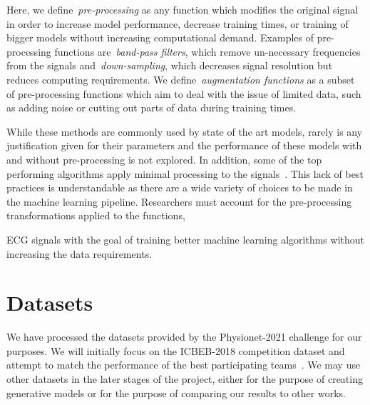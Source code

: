 \documentclass{article}
\begin{document}
Here, we define~\textit{pre-processing} as any function which modifies the original signal in order to increase model performance, decrease training times, or training of bigger models without increasing computational demand. Examples of pre-processing functions are~\textit{band-pass filters}, which remove un-necessary frequencies from the signals and~\textit{down-sampling}, which decreases signal resolution but reduces computing requirements.  We define~\textit{augmentation functions} as a subset of pre-processing functions which aim to deal with the issue of limited data, such as adding noise or cutting out parts of data during training times.

While these methods are commonly used by state of the art models, rarely is any justification given for their parameters and the performance of these models with and without pre-processing is not explored. In addition, some of the top performing algorithms apply minimal processing to the signals~\cite{natarajan2020wide,ribeiro2020automatic}. This lack of best practices is understandable as there are a wide variety of choices to be made in the machine learning pipeline. Researchers must account for the pre-processing transformations applied to the functions, 

ECG signals with the goal of training better machine learning algorithms without increasing the data requirements.  
\section{Datasets}
We have processed the datasets provided by the Physionet-2021 challenge for our purposes. We will initially focus on the ICBEB-2018 competition dataset and attempt to match the performance of the best participating teams~\cite{liu2018open}. We may use other datasets in the later stages of the project, either for the purpose of creating generative models or for the purpose of comparing our results to other works. 



\printbibliography
\end{document}
